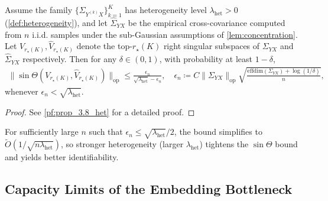 \begin{proposition}
\label{prop:heterogeneity_identifiability}
Assume the family $\{\Sigma_{Y^{(k)}X}\}_{k=1}^K$ has heterogeneity level
$\lambda_{\mathrm{het}} > 0$ (\cref{def:heterogeneity}), and let
$\widehat{\Sigma}_{YX}$ be the empirical cross-covariance computed from
$n$ i.i.d. samples under the sub-Gaussian assumptions of
\cref{lem:concentration}. Let $V_{r_\star(K)}, \widehat{V}_{r_\star(K)}$
denote the top-$r_\star(K)$ right singular subspaces of $\Sigma_{YX}$
and $\widehat{\Sigma}_{YX}$ respectively. Then for any $\delta \in (0,1)$,
with probability at least $1-\delta$,
\begin{align*}
    \|\sin\Theta(V_{r_\star(K)}, \widehat{V}_{r_\star(K)})\|_{\mathrm{op}}
    \le \frac{\epsilon_n}{\sqrt{\lambda_{\mathrm{het}}} - \epsilon_n}, \quad \epsilon_n \coloneqq C \|\Sigma_{YX}\|_{\mathrm{op}} \sqrt{\tfrac{\mathrm{effdim}(\Sigma_{YX}) + \log(1/\delta)}{n}},
\end{align*}
whenever $\epsilon_n < \sqrt{\lambda_{\mathrm{het}}}$.
\end{proposition}
\begin{proof}
    See \cref{pf:prop_3.8_het} for a detailed proof.
\end{proof}



For sufficiently large $n$ such that
$\epsilon_n \le \sqrt{\lambda_{\mathrm{het}}}/2$,
the bound simplifies to $\tilde{O} \left({1}/{\sqrt{n \lambda_{\mathrm{het}}}}\right)$,
so stronger heterogeneity (larger $\lambda_{\mathrm{het}}$) tightens the
$\sin\Theta$ bound and yields better identifiability.


\subsection{Capacity Limits of the Embedding Bottleneck}
\label{sec:capacity_limit}

